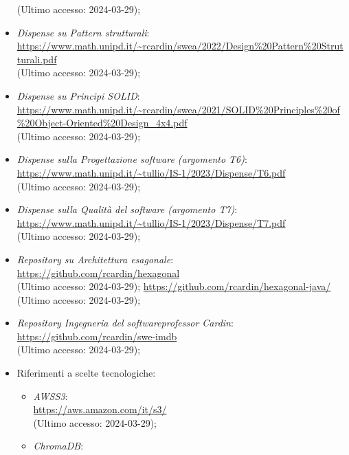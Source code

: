 \documentclass[10pt, a4paper]{article}
\begin{document}
\begin{itemize}
            (Ultimo accesso: 2024-03-29);
        \item \textit{Dispense su Pattern strutturali}: \\
            \url{https://www.math.unipd.it/~rcardin/swea/2022/Design%20Pattern%20Strutturali.pdf}\\
            (Ultimo accesso: 2024-03-29);
        \item \textit{Dispense su Principi SOLID}: \\
            \url{https://www.math.unipd.it/~rcardin/swea/2021/SOLID%20Principles%20of%20Object-Oriented%20Design_4x4.pdf}\\
            (Ultimo accesso: 2024-03-29);
        \item \textit{Dispense sulla Progettazione software (argomento T6)}: \\
            \url{https://www.math.unipd.it/~tullio/IS-1/2023/Dispense/T6.pdf}\\
            (Ultimo accesso: 2024-03-29);
        \item \textit{Dispense sulla Qualità del software (argomento T7)}: \\
            \url{https://www.math.unipd.it/~tullio/IS-1/2023/Dispense/T7.pdf}\\
            (Ultimo accesso: 2024-03-29);
        \item \textit{Repository su Architettura esagonale}: \\
            \url{https://github.com/rcardin/hexagonal}\\
            (Ultimo accesso: 2024-03-29);
            \url{https://github.com/rcardin/hexagonal-java/}\\
            (Ultimo accesso: 2024-03-29);
        \item \textit{Repository Ingegneria del software\pg professor Cardin}: \\
            \url{https://github.com/rcardin/swe-imdb}\\
            (Ultimo accesso: 2024-03-29);
        \item Riferimenti a scelte tecnologiche:
        \begin{itemize}
            \item \textit{AWS\pg S3}: \\
                \url{https://aws.amazon.com/it/s3/}\\
                (Ultimo accesso: 2024-03-29);
            \item \textit{ChromaDB}: \\

\end{itemize}
\end{itemize}
\end{document}
